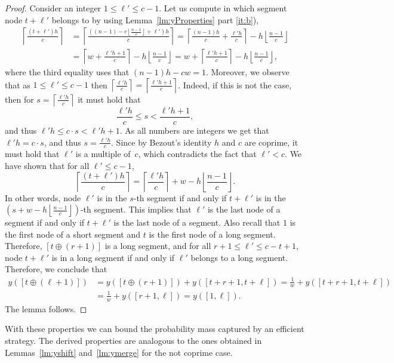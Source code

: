 \documentclass[11pt]{article}
\newcommand\+{\mkern2mu}
\newcommand{\floor}[1]{\left\lfloor #1 \right\rfloor}
\newcommand{\ceil}[1]{\left\lceil #1 \right\rceil}
\begin{document}
\begin{proof}
    Consider an integer $1\le \ell'\le c-1$. Let us compute in which segment node $t+\ell'$ belongs to by using Lemma~\ref{lm:yProperties} part \ref{it:b}),
    \begin{align*}
        \ceil{\frac{(t+\ell')h}{c}} &= \ceil{\frac{((n-1) - c \floor{\frac{n-1}{c}}+\ell')h}{c}} = \ceil{\frac{(n-1)h}{c}  +\frac{\ell' h}{c}} -h\floor{\frac{n-1}{c}}\\
        & = \ceil{w +  \frac{ \ell' h+1}{c}} -h\floor{\frac{n-1}{c}} = w+\ceil{\frac{ \ell' h+1}{c}} -h\floor{\frac{n-1}{c}}, 
    \end{align*}
    where the third equality uses that $(n-1)h-cw=1$. Moreover, we observe that as $1\le \ell' \le c-1$ then $\ceil{\frac{\ell'h}{c}} = \ceil{\frac{\ell'h+1}{c}}$. Indeed, if this is not the case, then for $s=\ceil{\frac{\ell'h}{c}}$ it must hold that
    $$\frac{\ell'h}{c}\le s < \frac{\ell'h+1}{c},$$
    and thus $\ell'h \le c\cdot s < \ell'h+1$. As all numbers are integers we get that $\ell'h = c\cdot s$, and thus $s=\frac{\ell'h}{c}$. Since by Bezout's identity $h$ and $c$ are coprime, it must hold that $\ell'$ is a multiple of~$c$, which contradicts the fact that $\ell'<c$. We have shown that for all $\ell'\le c-1$, 
    $$\ceil{\frac{(t+\ell')h}{c}} = \ceil{\frac{ \ell' h}{c}}+  w-h\floor{\frac{n-1}{c}}.$$
    In other words, node $\ell'$ is in the $s$-th segment if and only if $t+\ell'$ is in the $(s+w-h\floor{\frac{n-1}{c}})$-th segment. This implies that $\ell'$ is the last node of a segment if and only if $t+\ell'$ is the last node of a segment. Also recall that $1$ is the first node of a short segment and $t$ is the first node of a long segment. Therefore, $[t\oplus (r+1)]$ is a long segment, and for all $r+1\le \ell' \le c-t+1$, node $t+\ell'$ is in a long segment if and only if $\ell'$ belongs to a long segment. Therefore, we conclude that
    \begin{align*}
        y([t\oplus (\ell+1)]) &= y([t\oplus (r+1)]) + y([t+r+1, t+\ell]) = \frac{1}{w} +  y([t+r+1, t+\ell])\\  &=  \frac{1}{w} +  y([r+1, \ell]) = y([1,\ell]).
    \end{align*}
    The lemma follows.
\end{proof}

With these properties we can bound the probability mass captured by an efficient strategy. The derived properties are analogous to the ones obtained in Lemmas~\ref{lm:yshift} and~\ref{lm:ymerge} for the not coprime case. 
\end{document}
